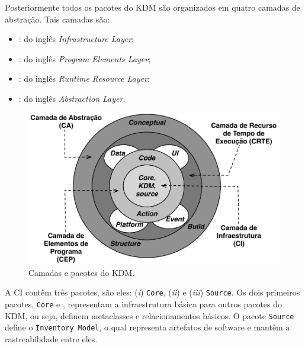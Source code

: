 Posteriormente todos os pacotes do KDM são organizados em quatro camadas de abstração. Tais camadas são:

\begin{itemize}
    \item {}: do inglês \textit{Infrastructure Layer};
    \item {}: do inglês \textit{Program Elements Layer};
    \item {}: do inglês \textit{Runtime Resource Layer};
    \item {}: do inglês \textit{Abstraction Layer}.
\end{itemize}




%
\begin{figure}[htb]
 \caption{Camadas e pacotes do KDM.}
 \label{fig:kdm_layer}
 \centering
 \includegraphics[scale=0.8]{images/kdm_layers.pdf}
\end{figure}
%
A CI contêm três pacotes, são eles: (\textit{i}) \texttt{Core}, (\textit{ii}) \texttt{} e (\textit{iii}) \texttt{Source}. Os dois primeiros pacotes, \texttt{Core} e \texttt{}, representam a infraestrutura básica para outros pacotes do KDM, ou seja, definem metaclasses e relacionamentos básicos. O pacote \texttt{Source} define o \texttt{Inventory Model}, o qual representa artefatos de software e mantêm a rastreabilidade entre eles. 

